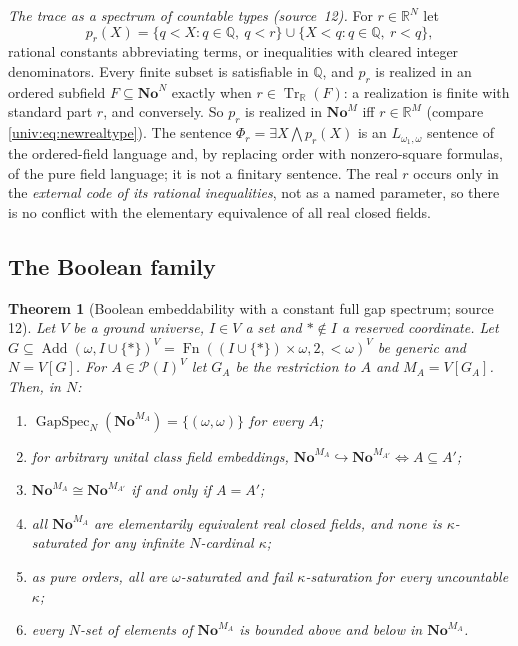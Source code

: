\documentclass[11pt,letterpaper]{article}
\numberwithin{equation}{section}
\newtheorem{theorem}{Theorem}[section]
\theoremstyle{definition}
\theoremstyle{remark}
\newcommand{\No}{\mathbf{No}}
\newcommand{\NoM}{\No^{M}}
\newcommand{\NoN}{\No^{N}}
\newcommand{\R}{\mathbb R}
\newcommand{\Q}{\mathbb Q}
\newcommand{\Pow}{\mathcal P}
\newcommand{\GapSpec}{\operatorname{GapSpec}}
\newcommand{\Add}{\operatorname{Add}}
\newcommand{\Fn}{\operatorname{Fn}}
\newcommand{\Tr}{\operatorname{Tr}_{\R}}
\begin{document}
\emph{The trace as a spectrum of countable types (source~12).} For $r\in\R^N$ let
\[
 p_r(X)=\{q<X:q\in\Q,\ q<r\}\cup\{X<q:q\in\Q,\ r<q\},
\]
rational constants abbreviating terms, or inequalities with cleared integer denominators.
Every finite subset is satisfiable in $\Q$, and $p_r$ is realized in an ordered subfield
$F\subseteq\NoN$ exactly when $r\in\Tr(F)$: a realization is finite with standard part $r$,
and conversely. So $p_r$ is realized in $\NoM$ iff $r\in\R^M$ (compare \eqref{univ:eq:newrealtype}).
The sentence $\Phi_r=\exists X\bigwedge p_r(X)$ is an $L_{\omega_1,\omega}$ sentence of the
ordered-field language and, by replacing order with nonzero-square formulas, of the pure field
language; it is not a finitary sentence. The real $r$ occurs only in the \emph{external code of
its rational inequalities}, not as a named parameter, so there is no conflict with the
elementary equivalence of all real closed fields.

\subsection{The Boolean family}

\begin{theorem}[Boolean embeddability with a constant full gap spectrum; source 12]\label{univ:gs:thm:boolean}
Let $V$ be a ground universe, $I\in V$ a set and $*\notin I$ a reserved coordinate. Let
$G\subseteq\Add(\omega,I\cup\{*\})^V=\Fn((I\cup\{*\})\times\omega,2,{<}\omega)^V$ be generic and
$N=V[G]$. For $A\in\Pow(I)^V$ let $G_A$ be the restriction to $A$ and $M_A=V[G_A]$. Then, in
$N$:
\begin{enumerate}[label=\textnormal{(\roman*)}]
\item $\GapSpec_N(\No^{M_A})=\{(\omega,\omega)\}$ for every $A$;
\item for arbitrary unital class field embeddings,
$\No^{M_A}\hookrightarrow\No^{M_{A'}}\iff A\subseteq A'$;
\item $\No^{M_A}\cong\No^{M_{A'}}$ if and only if $A=A'$;
\item all $\No^{M_A}$ are elementarily equivalent real closed fields, and none is
$\kappa$-saturated for any infinite $N$-cardinal $\kappa$;
\item as pure orders, all are $\omega$-saturated and fail $\kappa$-saturation for every
uncountable $\kappa$;
\item every $N$-set of elements of $\No^{M_A}$ is bounded above and below in $\No^{M_A}$.
\end{enumerate}
\end{theorem}
\end{document}
